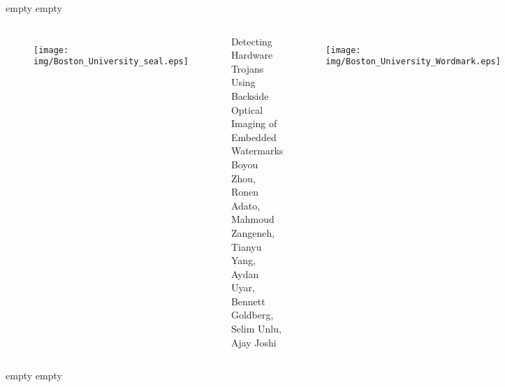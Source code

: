 \documentclass{beamer}
\newcommand{\titlebox}{
    \begin{center}
        \begin{tcolorbox}[left=2cm,right=2cm,arc=2cm,boxrule=5mm,width=\textwidth,colframe=red!70!black,colback=yellow!10]
            \begin{center}
}
\newcommand{\titleboxend}{
            \end{center}
        \end{tcolorbox}
    \end{center}
}
\begin{document}
    {\color{white}empty empty}\\
    
    \begin{columns}
            \begin{figure}
                \texttt{[image: img/Boston\_University\_seal.eps]}
            \end{figure}
            \titlebox
            \Huge{Detecting Hardware Trojans Using Backside Optical Imaging of
            Embedded Watermarks}\\
            \large{Boyou Zhou, Ronen Adato, Mahmoud Zangeneh, Tianyu Yang, Aydan
            Uyar, \\Bennett Goldberg, Selim Unlu, Ajay Joshi\\}
            \titleboxend
            \begin{figure}
                \texttt{[image: img/Boston\_University\_Wordmark.eps]}
            \end{figure}
    \end{columns}

    {\color{white}empty empty}\\
\end{document}
